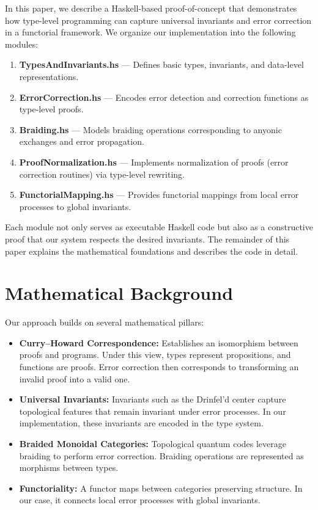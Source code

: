 \documentclass[12pt]{article}
\begin{document}
In this paper, we describe a Haskell-based proof-of-concept that demonstrates how type-level programming can capture universal invariants and error correction in a functorial framework. We organize our implementation into the following modules:
\begin{enumerate}[label=\textbf{Module \arabic*:}, leftmargin=*, labelsep=1em]
  \item \textbf{TypesAndInvariants.hs} --- Defines basic types, invariants, and data-level representations.
  \item \textbf{ErrorCorrection.hs} --- Encodes error detection and correction functions as type-level proofs.
  \item \textbf{Braiding.hs} --- Models braiding operations corresponding to anyonic exchanges and error propagation.
  \item \textbf{ProofNormalization.hs} --- Implements normalization of proofs (error correction routines) via type-level rewriting.
  \item \textbf{FunctorialMapping.hs} --- Provides functorial mappings from local error processes to global invariants.
\end{enumerate}

Each module not only serves as executable Haskell code but also as a constructive proof that our system respects the desired invariants. The remainder of this paper explains the mathematical foundations and describes the code in detail.

\section{Mathematical Background}

Our approach builds on several mathematical pillars:
\begin{itemize}
  \item \textbf{Curry–Howard Correspondence:} Establishes an isomorphism between proofs and programs. Under this view, types represent propositions, and functions are proofs. Error correction then corresponds to transforming an invalid proof into a valid one.
  \item \textbf{Universal Invariants:} Invariants such as the Drinfel’d center capture topological features that remain invariant under error processes. In our implementation, these invariants are encoded in the type system.
  \item \textbf{Braided Monoidal Categories:} Topological quantum codes leverage braiding to perform error correction. Braiding operations are represented as morphisms between types.
  \item \textbf{Functoriality:} A functor maps between categories preserving structure. In our case, it connects local error processes with global invariants.
\end{itemize}
\end{document}
